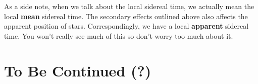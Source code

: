 \documentclass{article}
\begin{document}
As a side note, when we talk about the local sidereal time, we actually mean the local \textbf{mean} sidereal time. The secondary effects outlined above also affects the apparent position of stars. Correspondingly, we have a local \textbf{apparent} sidereal time. You won't really see much of this so don't worry too much about it.

\section{To Be Continued (?)}

%


\end{document}

